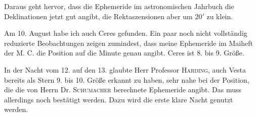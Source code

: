 \par\indent Daraus geht hervor, dass die Ephemeride im astronomischen Jahrbuch die Deklinationen jetzt gut angibt, die Rektaszensionen aber um $20'$ zu klein.

\par\indent Am 10. August habe ich auch Ceres gefunden. Ein paar noch nicht vollständig reduzierte Beobachtungen zeigen zumindest, dass meine Ephemeride im Maiheft der M. C. die Position auf die Minute genau angibt. Ceres ist 8. bis 9. Größe.

\par\indent In der Nacht vom 12. auf den 13. glaubte Herr Professor \textsc{Harding}, auch Vesta bereits als Stern 9. bis 10. Größe erkannt zu haben, sehr nahe bei der Position, die die von Herrn Dr. \textsc{Schumacher} berechnete Ephemeride angibt. Das muss allerdings noch bestätigt werden. Dazu wird die erste klare Nacht genutzt werden.

